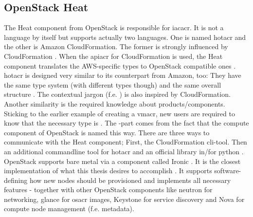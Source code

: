 \subsection{OpenStack Heat}
The Heat component from OpenStack is responsible for \gls{iacacr}. It is not a language by itself but supports actually two languages. One is named \gls{hotacr} and the other is Amazon CloudFormation. The former is strongly influenced by CloudFormation \cite{openstack_heat_template_guide}. When the \gls{apiacr} for CloudFormation is used, the Heat component translates the AWS-specific types to OpenStack compatible ones \cite{openstack_heat_architecture}.
\newline
\Gls{hotacr} is designed very similar to its counterpart from Amazon, too: They have the same type system (with different types though) and the same overall structure \cite{openstack_heat_architecture}. The contextual jargon (f.e. ) is also inspired by CloudFormation.
\newline
Another similarity is the required knowledge about products/components. Sticking to the earlier example of creating a \gls{vmacr}, new users are required to know that the necessary type is . The -part comes from the fact that the compute component of OpenStack is named this way.
\newline
There are three ways to communicate with the Heat component; First, the CloudFormation cli-tool. Then an additional commandline tool for \gls{hotacr} \cite{openstack_cli_heat} and an official library in/for python \cite{openstack_python_heat}.
\newline
OpenStack supports bare metal via a component called Ironic \cite{openstack_ironic_architecture}. It is the closest implementation of what this thesis desires to accomplish \cite{redhat_bare_metal}. It supports software-defining how new nodes should be provisioned and implements all necessary features - together with other OpenStack components like neutron for networking, glance for \gls{osacr} images, Keystone for service discovery and Nova for compute node management (f.e. metadata).


